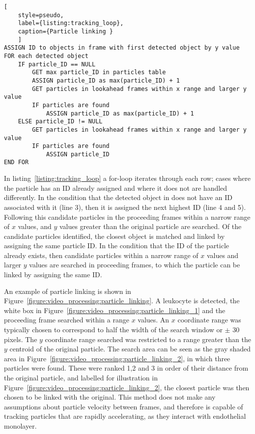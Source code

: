 \begin{lstlisting}[
	style=pseudo,
	label={listing:tracking_loop},
	caption={Particle linking }
	]
ASSIGN ID to objects in frame with first detected object by y value
FOR each detected object
	IF particle_ID == NULL
		GET max particle_ID in particles table
		ASSIGN particle_ID as max(particle_ID) + 1
		GET particles in lookahead frames within x range and larger y value
		IF particles are found
			ASSIGN particle_ID as max(particle_ID) + 1
	ELSE particle_ID != NULL
		GET particles in lookahead frames within x range and larger y value
		IF particles are found
			ASSIGN particle_ID
END FOR
\end{lstlisting}

In listing~\ref{listing:tracking_loop} a for-loop iterates through each row; cases where the particle has an ID already assigned and where it does not are handled differently. In the condition that the detected object in does not have an ID associated with it (line 3), then it is assigned the next highest ID (line 4 and 5). Following this candidate particles in the proceeding frames within a narrow range of $x$ values, and $y$ values greater than the original particle are searched. Of the candidate particles identified, the closest object is matched and linked by assigning the same particle ID. In the condition that the ID of the particle already exists, then candidate particles within a narrow range of $x$ values and larger $y$ values are searched in proceeding frames, to which the particle can be linked by assigning the same ID.

An example of particle linking is shown in Figure~\ref{figure:video_processing:particle_linking}. A leukocyte is detected, the white box in Figure~\ref{figure:video_processing:particle_linking_1} and the proceeding frame searched within a range $x$ values. An $x$ coordinate range was typically chosen to correspond to half the width of the search window or $\pm$ 30 pixels. The $y$ coordinate range searched was restricted to a range greater than the $y$ centroid of the original particle. The search area can be seen as the gray shaded area in Figure~\ref{figure:video_processing:particle_linking_2}, in which three particles were found. These were ranked 1,2 and 3 in order of their distance from the original particle, and labelled for illustration in Figure~\ref{figure:video_processing:particle_linking_2}, the closest particle was then chosen to be linked with the original. This method does not make any assumptions about particle velocity between frames, and therefore is capable of tracking particles that are rapidly accelerating, as they interact with endothelial monolayer.

